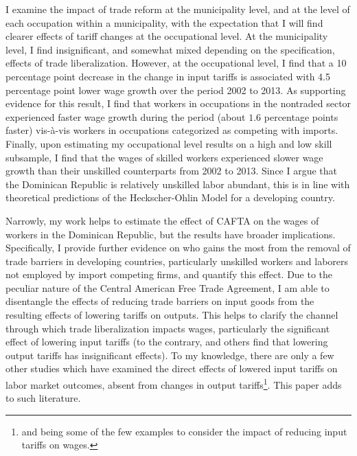 \documentclass[12pt]{article}
\begin{document}
I examine the impact of trade reform at the municipality level, and at the level of each occupation
within a municipality, with the expectation that I will find clearer effects of tariff changes at
the occupational level. At the municipality level, I find insignificant, and somewhat mixed depending
on the specification, effects of trade liberalization. However, at the occupational level, 
I find that a 10 percentage point decrease in the change in input tariffs is associated with 4.5 
percentage point lower wage growth over the period 2002 to 2013. As supporting evidence for this result, I find that
workers in occupations in the nontraded sector experienced faster wage growth during the period 
(about $1.6$ percentage points faster) vis-\`{a}-vis workers in occupations categorized as competing with 
imports. Finally, upon estimating my occupational level results on a high and low skill subsample, 
I find  that the wages of skilled workers experienced slower wage growth than their unskilled 
counterparts from 2002 to 2013. Since I argue that the Dominican Republic is relatively unskilled labor
abundant, this is in line with theoretical predictions of the Heckscher-Ohlin Model 
for a developing country.

Narrowly, my work helps to estimate the effect of CAFTA on the wages of workers in the 
Dominican Republic, but the results have broader implications. Specifically, 
I provide further evidence on who gains the most from the removal of trade barriers in developing
countries, particularly unskilled workers and laborers not employed by import competing firms,
and quantify this effect. Due to the peculiar nature
of the Central American Free Trade Agreement, I am able to disentangle the effects
of reducing trade barriers on input goods from the resulting effects of lowering tariffs on outputs.
This helps to clarify the channel through which trade liberalization impacts wages, particularly
the significant effect of lowering input tariffs (to the contrary, \citet{amiti2012trade} and others 
find that lowering output tariffs has insignificant effects). 
To my knowledge, there are only a few other studies which have examined the direct effects of lowered input 
tariffs on labor market outcomes, absent from changes in output tariffs\footnote{\citet{amiti2012trade}
and \citet{amiti} being some of the few examples to consider the impact of reducing input 
tariffs on wages.}. This paper adds to such literature.

\end{document}
